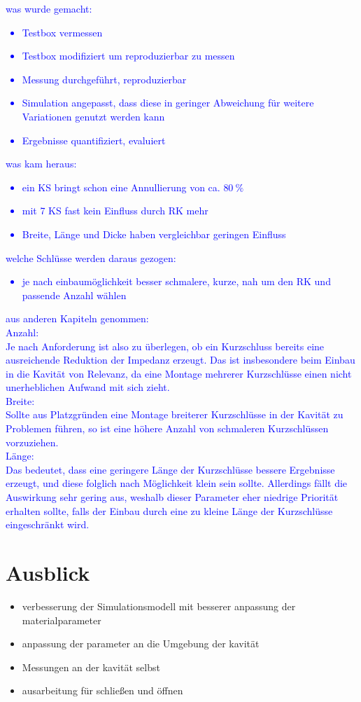 \textcolor{blue}{
was wurde gemacht:
\begin{itemize}
    \item Testbox vermessen
    \item Testbox modifiziert um reproduzierbar zu messen
    \item Messung durchgef\"uhrt, reproduzierbar
    \item Simulation angepasst, dass diese in geringer Abweichung f\"ur weitere Variationen genutzt werden kann
    \item Ergebnisse quantifiziert, evaluiert
\end{itemize}
was kam heraus:
\begin{itemize}
    \item ein KS bringt schon eine Annullierung von ca. $80~\%$
    \item mit 7 KS fast kein Einfluss durch RK mehr
    \item Breite, Länge und Dicke haben vergleichbar geringen Einfluss
\end{itemize}
welche Schlüsse werden daraus gezogen:
\begin{itemize}
    \item je nach einbaumöglichkeit besser schmalere, kurze, nah um den RK und passende Anzahl wählen
\end{itemize}
aus anderen Kapiteln genommen:\\
Anzahl:\\
Je nach Anforderung ist also zu \"uberlegen, ob ein Kurzschluss bereits eine ausreichende Reduktion der Impedanz erzeugt. Das ist insbesondere beim Einbau in die Kavit\"at von Relevanz, da eine Montage mehrerer Kurzschl\"usse einen nicht unerheblichen Aufwand mit sich zieht.\\
Breite:\\
Sollte aus Platzgr\"unden eine Montage breiterer Kurzschl\"usse in der Kavit\"at zu Problemen f\"uhren, so ist eine h\"ohere Anzahl von schmaleren Kurzschl\"ussen vorzuziehen.\\
Länge:\\
Das bedeutet, dass eine geringere L\"ange der Kurzschl\"usse bessere Ergebnisse erzeugt, und diese folglich nach M\"oglichkeit klein sein sollte. Allerdings f\"allt die Auswirkung sehr gering aus, weshalb dieser Parameter eher niedrige Priorit\"at erhalten sollte, falls der Einbau durch eine zu kleine L\"ange der Kurzschl\"usse eingeschr\"ankt wird.}

\section{Ausblick}
\begin{itemize}
    \item verbesserung der Simulationsmodell mit besserer anpassung der materialparameter
    \item anpassung der parameter an die Umgebung der kavität
    \item Messungen an der kavität selbst
    \item ausarbeitung für schließen und öffnen
\end{itemize}